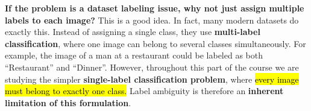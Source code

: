 \highspace
\textcolor{Green3}{ \textbf{If the problem is a dataset labeling issue, why not just assign multiple labels to each image?}} This is a good idea. In fact, many modern datasets do exactly this. Instead of assigning a single class, they use \textbf{multi-label classification}, where one image can belong to several classes simultaneously. For example, the image of a man at a restaurant could be labeled as both ``Restaurant'' and ``Dinner''. However, throughout this part of the course we are studying the simpler \textbf{single-label classification problem}, where \hl{every image must belong to exactly one class.} Label ambiguity is therefore an \textbf{inherent limitation of this formulation}.